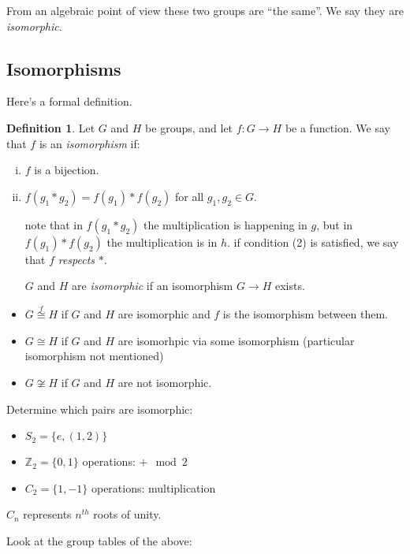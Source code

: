 \documentclass{article}
\theoremstyle{definition} \newtheorem*{definition}{Definition}
\newcommand{\ism}{\cong} \newcommand{\elemt}[2]{#1_{{#2}\sigma(#2)}}
\begin{document}
From an algebraic point of view these two groups are ``the same''. We say they
are \textit{isomorphic}.  \subsection{Isomorphisms} Here's a formal definition.\\


\begin{definition} Let $G$ and $H$ be groups, and let $f : G \rightarrow H$ be
a function. We say that $f$ is an \emph{isomorphism} if: \begin{enumerate}[(i)]
  \item $f$ is a bijection.  \item $f(g_1 * g_2)=f(g_1) * f(g_2) $ for all
    $g_1, g_2 \in G$.

note that in $f(g_1 * g_2)$ the multiplication is happening in $g$, but in
$f(g_1) * f(g_2)$ the multiplication is in $h$. if condition (2) is satisfied,
we say that $f$ \emph{respects} $*$.

$G$ and $H$ are \emph{isomorphic} if an isomorphism $G \rightarrow H$ exists.
\end{enumerate} \end{definition}

\begin{itemize} \item $G \overset{f}{\ism} H$ if $G$ and $H$ are isomorphic and
    $f$ is the isomorphism between them.  \item $G \ism H$ if $G$ and $H$ are
    isomorhpic via some isomorphism (particular isomorphism not mentioned)
  \item $G \not\ism H$ if $G$ and $H$ are not isomorphic.\\ \end{itemize}
\begin{exmps} Determine which pairs are isomorphic:

\begin{itemize} \item $S_2=\{e, (1, 2)\}$ \item $\mathbb{Z}_2=\{0,1\}$
    operations: $+\mod 2$ \item $C_2=\{1,-1\}$ operations: multiplication
  \end{itemize} $C_n$ represents $n^{th}$ roots of unity.
  
\end{exmps}

Look at the group tables of the above:
\end{document}
